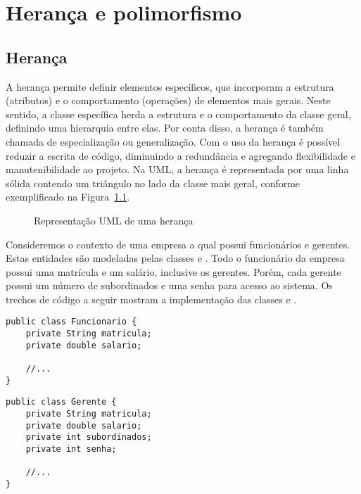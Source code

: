 \chapter{Herança e polimorfismo}

\section{Herança}

A herança permite definir elementos específicos, que incorporam a estrutura (atributos) e o comportamento (operações) de elementos mais gerais. Neste sentido, a classe específica herda a estrutura e o comportamento da classe geral, definindo uma hierarquia entre elas. Por conta disso, a herança é também chamada de especialização ou generalização. Com o uso da herança é possível reduzir a escrita de código, diminuindo a redundância e agregando flexibilidade e manutenibilidade ao projeto. Na UML, a herança é representada por uma linha sólida contendo um triângulo no lado da classe mais geral, conforme exemplificado na Figura~\ref{fig:exemplo-heranca-uml}.

\begin{figure}[h]
	\centering
	
	
	\caption{Representação UML de uma herança}
	\label{fig:exemplo-heranca-uml}
\end{figure}

Consideremos o contexto de uma empresa a qual possui funcionários e gerentes. Estas entidades são modeladas pelas classes  e . Todo o funcionário da empresa possui uma matrícula e um salário, inclusive os gerentes. Porém, cada gerente possui um número de subordinados e uma senha para acesso ao sistema. Os trechos de código a seguir mostram a implementação das classes  e .
 
\begin{verbatim}
public class Funcionario {
	private String matricula;
	private double salario;

	//...
}
\end{verbatim}
 
\begin{verbatim}
public class Gerente {
	private String matricula;
	private double salario;
	private int subordinados;
	private int senha;
	
	//...
}
\end{verbatim}
 

